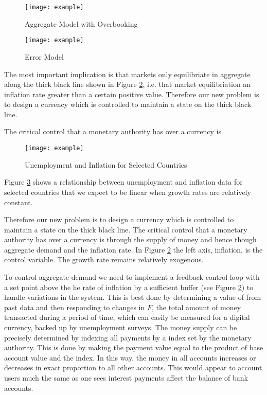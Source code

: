 \begin{figure}
\centering
\texttt{[image: example]}
\caption{Aggregate Model with Overbooking}
\label{fig:aggregate_overbooking}
\end{figure}

\begin{figure}
\centering
\texttt{[image: example]}
\caption{Error Model}
\label{fig:error_model}
\end{figure}

The most important implication is that markets only equilibriate in aggregate along the thick black
line shown in Figure \ref{fig:error_model}, i.e. that market equilibriation an inflation rate
greater than a certain positive value. Therefore our new problem is to design a currency which is
controlled to maintain a state on the thick black line.

The critical control that a monetary authority has over a currency is

\begin{figure}
\centering
\texttt{[image: example]}
\caption{Unemployment and Inflation for Selected Countries}
\label{fig:ui_multi}
\end{figure}

Figure \ref{fig:ui_multi} shows a relationship between unemployment and inflation data for selected
countries that we expect to be linear when growth rates are relatively constant.

Therefore our new problem is to design a currency which is controlled to maintain a
state on the thick black line. The critical control that a monetary authority has over a currency is
through the supply of money and hence though aggregate demand and the inflation rate. In Figure
\ref{fig:error_model} the left axis, inflation, is the control variable. The growth
rate remains relatively exogenous.

To control aggregate demand we need to implement a feedback control loop with a set point above the
he rate of inflation by a sufficient buffer (see Figure \ref{fig:error_model}) to handle variations
in the system. This is best done by determining a value of from past data and then responding to
changes in $F$, the
total amount of money transacted during a period of time, which can easily be measured for a digital
currency, backed up by unemployment surveys. The money supply can be precisely determined by
indexing all payments by a index set by the monetary authority. This is done by making the payment
value equal to the product of base account value and the index. In this way, the money in all
accounts increases or decreases in exact proportion to all other accounts. This would appear to
account users much the same as one sees interest payments affect the balance of bank accounts.

